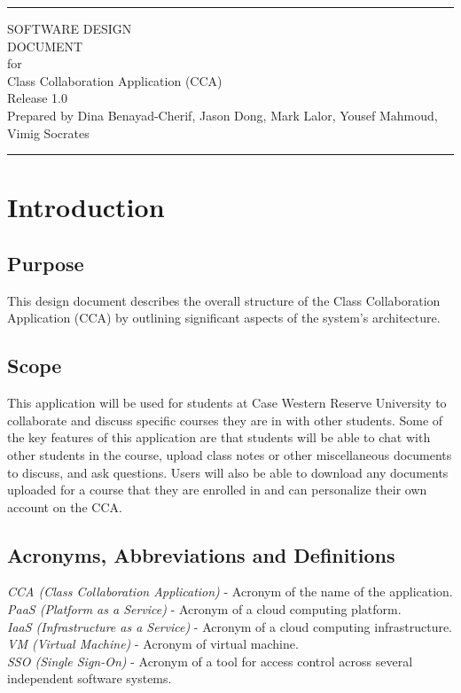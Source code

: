 \documentclass{scrreprt}
\date{}
\def\myversion{1.0}
\begin{document}
\begin{flushright}
	\rule{16cm}{5pt}\vskip1cm
	\Huge{SOFTWARE DESIGN\\ DOCUMENT}\\
	\vspace{2cm}
	for\\
	\vspace{2cm}
	Class Collaboration Application (CCA)\\
	\vspace{2cm}
	\LARGE{Release \myversion \\}
	\vspace{2cm}
	Prepared by Dina Benayad-Cherif, Jason Dong, Mark Lalor, Yousef Mahmoud, Vimig Socrates\\
	\vfill
	\rule{16cm}{5pt}
\end{flushright}

\tableofcontents


\chapter{Introduction}

\section{Purpose}
This design document describes the overall structure of the Class Collaboration Application (CCA) by outlining significant aspects of the system’s architecture.


\section{Scope}
This application will be used for students at Case Western Reserve University to collaborate and discuss specific courses they are in with other students. Some of the key features of this application are that students will be able to chat with other students in the course, upload class notes or other miscellaneous documents to discuss, and ask questions. Users will also be able to download any documents uploaded for a course that they are enrolled in and can personalize their own account on the CCA. 

\section{Acronyms, Abbreviations and Definitions}
\textit{CCA (Class Collaboration Application)} - Acronym of the name of the application.  \\
\textit{PaaS (Platform as a Service)} - Acronym of a cloud computing platform. \\
\textit{IaaS (Infrastructure as a Service)} - Acronym of a cloud computing infrastructure.\\
\textit{VM (Virtual Machine)} - Acronym of virtual machine. \\
\textit{SSO (Single Sign-On)} - Acronym of a tool for access control across several independent software systems. 
\end{document}
